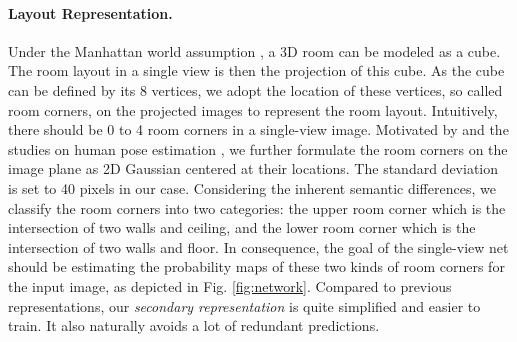 \paragraph{Layout Representation.}
Under the Manhattan world assumption \cite{coughlan1999manhattan}, a 3D room can be modeled as a cube. The room layout in a single view is then the projection of this cube. As the cube can be defined by its 8 vertices, we adopt the location of these vertices, so called room corners, on the projected images to represent the room layout. Intuitively, there should be 0 to 4 room corners in a single-view image. 
%
Motivated by \cite{LeeRoomNet17} and the studies on human pose estimation \cite{tompson2014joint,pfister2015flowing}, we further formulate the room corners on the image plane as 2D Gaussian centered at their locations. The standard deviation is set to 40 pixels in our case.
%
Considering the inherent semantic differences, we classify the room corners into two categories: the upper room corner which is the intersection of two walls and ceiling, and the lower room corner which is the intersection of two walls and floor. In consequence, the goal of the single-view net should be estimating the probability maps of these two kinds of room corners for the input image, as depicted in Fig. \ref{fig:network}.
%
Compared to previous representations, our \emph{secondary representation} is quite simplified and easier to train. It also naturally avoids a lot of redundant predictions. 

 

